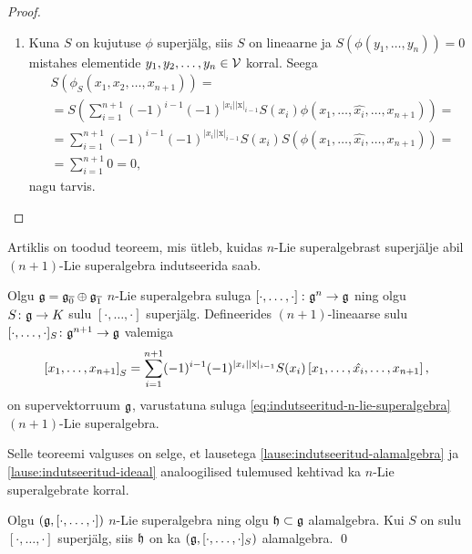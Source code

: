\begin{proof}
\begin{enumerate}[label=\arabic*)]
        \item Kuna $S$ on kujutuse $\phi$ superjälg, siis $S$ on
            lineaarne ja $S(\phi(y_1, \dots, y_n)) = 0$ mistahes
            elementide $y_1, y_2, \dots, y_n \in \mathcal{V}$ korral. Seega
            \begin{align*}
                & S\left(\phi_S(x_1, x_2, \dots, x_{n+1})\right) = \\
                &= S\left( \sum_{i=1}^{n+1}
                    (-1)^{i-1} (-1)^{|x_i||\mathrm{x}|_{i-1}}
                    S(x_i) \phi(
                        x_1, \dots, \hat{x_i}, \dots, x_{n+1}
                    )
                    \right) = \\
                &= \sum_{i=1}^{n+1}
                    (-1)^{i-1} (-1)^{|x_i||\mathrm{x}|_{i-1}}
                    S(x_i) S(\phi(
                        x_1, \dots, \hat{x_i}, \dots, x_{n+1}
                    )) = \\
                &= \sum_{i=1}^{n+1} 0 = 0,
            \end{align*}
            nagu tarvis. \qedhere
    \end{enumerate}
\end{proof}

Artiklis \cite{Abramov:2014} on toodud teoreem, mis ütleb, kuidas
$n$-Lie superalgebrast superjälje abil $(n+1)$-Lie superalgebra
indutseerida saab.

\begin{thm}
    Olgu $\mathfrak{g} = \mathfrak{g}_{\overline{0}} \oplus \mathfrak{g}_{\overline{1}}$
    $n$-Lie superalgebra suluga
    $\left[ \cdot, \dots, \cdot \right] \colon \mathfrak{g}^n \to \mathfrak{g}$ ning olgu
    $S \colon \mathfrak{g} \to K$ sulu $[\cdot, \dots, \cdot]$ superjälg.
    Defineerides $(n+1)$-lineaarse sulu
    $[\cdot, \dots, \cdot]_S \colon \mathfrak{g}^{n+1} \to \mathfrak{g}$ valemiga
    \begin{align}\label{eq:indutseeritud-n-lie-superalgebra}
        \left[ x_1, \dots, x_{n+1} \right]_S = \sum_{i=1}^{n+1}
        (-1)^{i-1} (-1)^{|x_i| |\mathrm{x}|_{i-1}} S(x_i)
        \left[ x_1, \dots, \hat{x_i}, \dots, x_{n+1} \right],
    \end{align}
    on supervektorruum $\mathfrak{g}$, varustatuna suluga
    \eqref{eq:indutseeritud-n-lie-superalgebra} $(n+1)$-Lie
    superalgebra.
\end{thm}

Selle teoreemi valguses on selge, et lausetega
\ref{lause:indutseeritud-alamalgebra} ja
\ref{lause:indutseeritud-ideaal} analoogilised tulemused
kehtivad ka $n$-Lie superalgebrate korral.

\begin{lau}
    Olgu $(\mathfrak{g}, [\cdot, \dots, \cdot])$ $n$-Lie superalgebra ning
    olgu $\mathfrak{h} \subset \mathfrak{g}$ alamalgebra. Kui $S$ on
    sulu $[\cdot, \dots, \cdot]$ superjälg,
    siis $\mathfrak{h}$ on ka $(\mathfrak{g}, [\cdot, \dots, \cdot]_S)$ alamalgebra.
    \hfill \qed
\end{lau}

